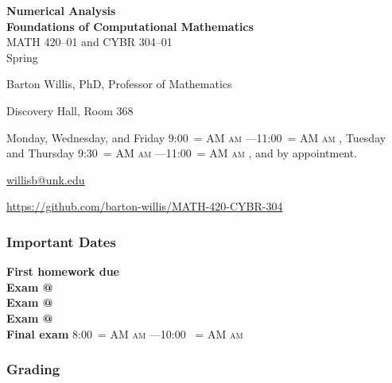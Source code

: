 \documentclass[12pt]{article}
\makeatletter
\newcommand*{\rom}[1]{\expandafter\@slowromancap\romannumeral #1@}
\newcounter{ex}\setcounter{ex}{0}
\newenvironment{mypar}[2]
  {\begin{list}{}%
    {\setlength\leftmargin{#1}
    \setlength\rightmargin{#2}}
    \item[]}
  {\end{list}}
\renewenvironment{description}[0]{\begin{compactdesc}}{\end{compactdesc}}
\DeclareRobustCommand{\maybefakesc}[1]{%
  \ifnum\pdfstrcmp{\f@series}{\bfdefault}=\z@
    {\fontsize{\dimexpr0.8\dimexpr\f@size pt\relax}{0}\selectfont\uppercase{#1}}%
  \else
    \textsc{#1}%
  \fi
}
\newcommand\AM{\,\maybefakesc{am}\xspace}
\newcommand{\coursename}{Numerical Analysis \\ Foundations of Computational Mathematics }
\newcommand{\coursenumber}{MATH 420--01 and CYBR 304--01}
\newcommand{\term}{Spring }
\newcommand{\officehours}{ Monday, Wednesday, and Friday 9:00\AM---11:00\AM,
    Tuesday and Thursday 9:30\AM---11:00\AM, and by appointment.}
\newcommand{\finaldateandtime}{\printdate{13/5/\the\year} 8:00\AM{}---10:00 \AM}
\makeatother
\begin{document}
\cleanlookdateon%
\shortdate
\printyearoff
\large
\begin{center}
    \textbf{\coursename}  \\
    {\coursenumber} \\
     {\term \the\year} \\
\end{center}

\vskip0.25in
\normalsize


\begin{center}
\begin{description}
    \item[Instructor:] Barton Willis, PhD, Professor of Mathematics
    \item[Office:]  Discovery Hall, Room 368
    \item[Office Hours:] \officehours
    \item[\phone:]  
    \item[\Email:]  \href{mailto:willisb@unk.edu}{willisb@unk.edu}
    \item[\faGithub]   \url{https://github.com/barton-willis/MATH-420-CYBR-304}

  \end{description}
\end{center}



\subsubsection*{Important Dates}

\begin{mypar}{0.25in}{0.25in} 

  \textbf{First homework due} \dotfill  {}  \\
  \textbf{Exam \rom{1}} \dotfill {}  \\
  \textbf{Exam \rom{2}} \dotfill  {} \\
  \textbf{Exam \rom{3}} \dotfill {} \\
  \textbf{Final exam} \dotfill  \finaldateandtime
\end{mypar}

\subsubsection*{Grading}
\end{document}
